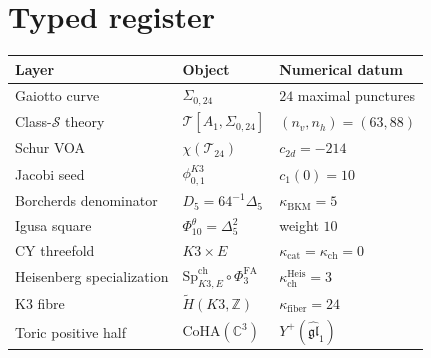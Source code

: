 \documentclass[11pt]{article}
\providecommand{\C}{\mathbb{C}}
\providecommand{\Z}{\mathbb{Z}}
\providecommand{\cS}{\mathcal{S}}
\providecommand{\cT}{\mathcal{T}}
\providecommand{\fgl}{\mathfrak{gl}}
\providecommand{\CoHA}{\mathrm{CoHA}}
\providecommand{\SpCh}{\mathrm{Sp}^{\mathrm{ch}}}
\providecommand{\PhiFA}{\Phi^{\mathrm{FA}}}
\providecommand{\kcat}{\kappa_{\mathrm{cat}}}
\providecommand{\kch}{\kappa_{\mathrm{ch}}}
\providecommand{\kBKM}{\kappa_{\mathrm{BKM}}}
\providecommand{\kfib}{\kappa_{\mathrm{fiber}}}
\begin{document}
\section{Typed register}

\begin{center}
\renewcommand{\arraystretch}{1.25}
\begin{tabular}{lll}
\hline
Layer & Object & Numerical datum \\
\hline
Gaiotto curve & \(\Sigma_{0,24}\) & \(24\) maximal punctures \\
Class-\(\cS\) theory & \(\cT[A_1,\Sigma_{0,24}]\) & \((n_v,n_h)=(63,88)\) \\
Schur VOA & \(\chi(\cT_{24})\) & \(c_{2d}=-214\) \\
Jacobi seed & \(\phi_{0,1}^{K3}\) & \(c_1(0)=10\) \\
Borcherds denominator & \(D_5=64^{-1}\Delta_5\) & \(\kBKM=5\) \\
Igusa square & \(\Phi_{10}^{\theta}=\Delta_5^2\) & weight \(10\) \\
CY threefold & \(K3\times E\) & \(\kcat=\kch=0\) \\
Heisenberg specialization & \(\SpCh_{K3,E}\circ\PhiFA_3\) & \(\kch^{\mathrm{Heis}}=3\) \\
K3 fibre & \(\widetilde H(K3,\Z)\) & \(\kfib=24\) \\
Toric positive half & \(\CoHA(\C^3)\) & \(Y^+(\widehat{\fgl}_1)\) \\
\hline
\end{tabular}
\end{center}
\end{document}

